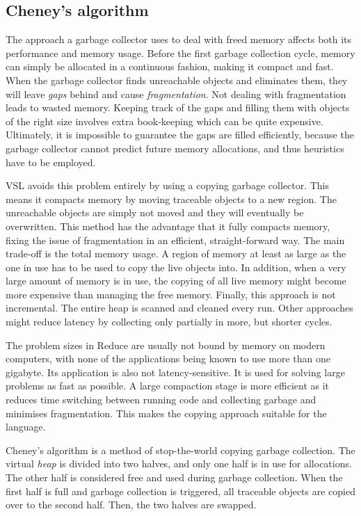 \subsection{Cheney's algorithm}
The approach a garbage collector uses to deal with freed memory affects both its performance and memory usage.
Before the first garbage collection cycle, memory can simply be allocated in a continuous fashion, making it
compact and fast. When the garbage collector finds unreachable objects and eliminates them, they will leave \emph{gaps} behind
and cause \emph{fragmentation}. Not dealing with fragmentation leads to wasted memory. Keeping track of the gaps
and filling them with objects of the right size involves extra book-keeping which can be quite expensive. Ultimately,
it is impossible to guarantee the gaps are filled efficiently, because the garbage collector cannot predict future
memory allocations, and thus heuristics have to be employed.

VSL avoids this problem entirely by using a copying garbage collector. This means it compacts memory by moving
traceable objects to a new region. The unreachable objects are simply not moved and they will eventually be overwritten.
This method has the advantage that it fully compacts memory, fixing the issue of fragmentation in an efficient,
straight-forward way. The main trade-off is the total memory usage. A region of memory at least
as large as the one in use has to be used to copy the live objects into. In addition, when a very large amount
of memory is in use, the copying of all live memory might become more expensive than managing the free memory.
Finally, this approach is not incremental. The entire heap is scanned and cleaned every run. Other approaches might
reduce latency by collecting only partially in more, but shorter cycles.

The problem sizes in Reduce are usually not bound by memory on modern computers, with none of the applications
being known to use more than one gigabyte. Its application is also not latency-sensitive. It is used for
solving large problems as fast as possible. A large compaction stage is more efficient as it reduces time
switching between running code and collecting garbage and minimises fragmentation.
This makes the copying approach suitable for the language.

Cheney's algorithm \cite{cheney} is a method of stop-the-world copying garbage collection. The virtual \emph{heap} is divided into
two halves, and only one half is in use for allocations. The other half is considered free and used during garbage
collection. When the first half is full and garbage collection is triggered, all traceable objects are copied over
to the second half. Then, the two halves are swapped.

